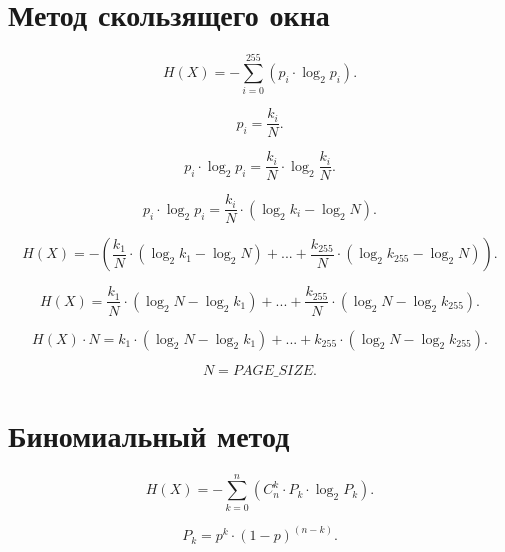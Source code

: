 \documentclass{bmstu}
\begin{document}
\section*{Метод скользящего окна}

\begin{equation}
    H(X) = -\sum_{i = 0}^{255} (p_{i} \cdot \log_{2}p_{i}).
\end{equation}

\begin{equation}
    p_{i} = \frac{k_i}{N}.
\end{equation}

\begin{equation}
    p_{i} \cdot \log_{2}p_{i} = \frac{k_i}{N} \cdot \log_{2}\frac{k_i}{N}.
\end{equation}

\begin{equation}
    p_{i} \cdot \log_{2}p_{i} = \frac{k_i}{N} \cdot (\log_{2}k_i - \log_{2}N).
\end{equation}

\begin{equation}
    H(X) = -(\frac{k_1}{N} \cdot (\log_{2}k_1 - \log_{2}N) + ... + \frac{k_{255}}{N} \cdot (\log_{2}k_{255} - \log_{2}N)).
\end{equation}

\begin{equation}
    H(X) = \frac{k_1}{N} \cdot ( \log_{2}N - \log_{2}k_1) + ... + \frac{k_{255}}{N} \cdot (\log_{2}N - \log_{2}k_{255}).
\end{equation}

\begin{equation}
    H(X) \cdot N = k_1 \cdot ( \log_{2}N - \log_{2}k_1) + ... + k_{255} \cdot (\log_{2}N - \log_{2}k_{255}).
\end{equation}

\begin{equation}
    N = PAGE\_SIZE.
\end{equation}

\section*{Биномиальный метод}

\begin{equation}
    H(X) = -\sum_{k = 0}^n (C_{n}^k \cdot P_{k} \cdot \log_{2}P_{k}).
\end{equation}

\begin{equation}\label{pk}
	P_{k} = p^k \cdot (1 - p)^{(n - k)}.
\end{equation} 
\end{document}
